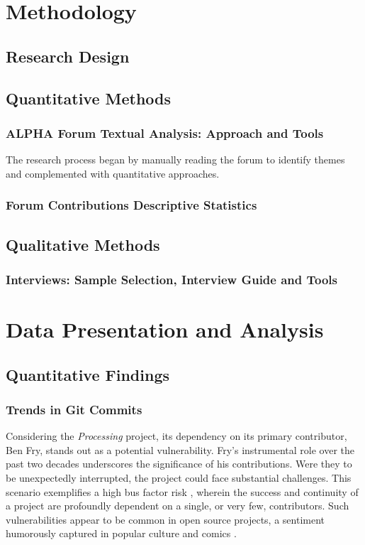 \documentclass{article}
\begin{document}
\section{Methodology}

\subsection{Research Design}
\subsection{Quantitative Methods}
\subsubsection{ALPHA Forum Textual Analysis: Approach and Tools}
The research process began by manually reading the forum to identify themes and complemented with quantitative approaches. 



\subsubsection{Forum Contributions Descriptive Statistics}

\subsection{Qualitative Methods}
\subsubsection{Interviews: Sample Selection, Interview Guide and Tools}


\section{Data Presentation and Analysis}

\subsection{Quantitative Findings}
\subsubsection{Trends in Git Commits}

Considering the \textit{Processing} project, its dependency on its primary contributor, Ben Fry, stands out as a potential vulnerability. Fry's instrumental role over the past two decades underscores the significance of his contributions. Were they to be unexpectedly interrupted, the project could face substantial challenges. This scenario exemplifies a high bus factor risk \parencite{BusFactor2023}, wherein the success and continuity of a project are profoundly dependent on a single, or very few, contributors. Such vulnerabilities appear to be common in open source projects, a sentiment humorously captured in popular culture and comics \parencite{munroeDependency2020}.
\end{document}
